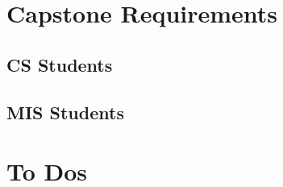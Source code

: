 \section{Capstone Requirements}
    \subsection{CS Students}
        \lipsum[1]
    \subsection{MIS Students}
        \lipsum[2]
\newpage
\section{To Dos}
    \lipsum[4]
